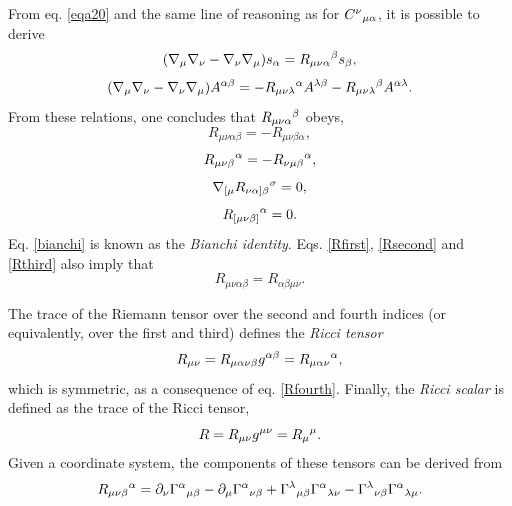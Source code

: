 \documentclass[
12pt,		%
openright,	%
twoside,  %
a4paper,			%
chapter=TITLE,		%
english,			%
french,				%
spanish,			%
brazil				%
]{USPSC-classe/USPSC}
\begin{document}
\begin{apendicesenv}
From eq. \ref{eqa20} and the same line of reasoning as for $C^{\nu}\mathstrut_{\mu\alpha}$, it is possible to derive 
\begin{equation}\label{Riedual}
    (\nabla_{\mu}\nabla_{\nu}-\nabla_{\nu}\nabla_{\mu})s_{\alpha}=R_{\mu\nu\alpha}\mathstrut^{\beta}s_{\beta},
\end{equation}
\begin{equation}\label{Rie2}
    (\nabla_{\mu}\nabla_{\nu}-\nabla_{\nu}\nabla_{\mu})A^{\alpha\beta}=-R_{\mu\nu\lambda}\mathstrut^{\alpha}A^{\lambda\beta}-R_{\mu\nu\lambda}\mathstrut^{\beta}A^{\alpha\lambda}.
\end{equation}
From these relations, one concludes that $R_{\mu\nu\alpha}\mathstrut^{\beta}$ obeys,
\begin{equation}\label{Rthird}
    R_{\mu\nu\alpha\beta}=-R_{\mu\nu\beta\alpha},
\end{equation}
\begin{equation}\label{Rfirst}
    R_{\mu\nu\beta}\mathstrut^{\alpha}=-R_{\nu\mu\beta}\mathstrut^{\alpha},
\end{equation}
\begin{equation}\label{bianchi}
    \nabla_{[\mu}R_{\nu\alpha]\beta}\mathstrut^{\sigma}=0,
\end{equation}
\begin{equation}\label{Rsecond}
    R_{[\mu\nu\beta]}\mathstrut^{\alpha}=0.
\end{equation}
Eq. \ref{bianchi} is known as the \textit{Bianchi identity}. Eqs. \ref{Rfirst}, \ref{Rsecond} and \ref{Rthird} also imply that
\begin{equation}\label{Rfourth}
    R_{\mu\nu\alpha\beta}=R_{\alpha\beta\mu\nu}.
\end{equation}

The trace of the Riemann tensor over the second and fourth indices (or equivalently, over the first and third) defines the \textit{Ricci tensor}
\begin{equation}
    R_{\mu\nu}=R_{\mu\alpha\nu\beta}g^{\alpha\beta}=R_{\mu\alpha\nu}\mathstrut^{\alpha},
\end{equation}
which is symmetric, as a consequence of eq. \ref{Rfourth}. Finally, the \textit{Ricci scalar} is defined as the trace of the Ricci tensor,
\begin{equation}
    R=R_{\mu\nu}g^{\mu\nu}=R_{\mu}\mathstrut^{\mu}.
\end{equation}
Given a coordinate system, the components of these tensors can be derived from \cite{Wald1984} 
\begin{equation}
    R_{\mu\nu\beta}\mathstrut^{\alpha}=\partial_{\nu}\Gamma^{\alpha}\mathstrut_{\mu\beta}-\partial_{\mu}\Gamma^{\alpha}\mathstrut_{\nu\beta}+\Gamma^{\lambda}\mathstrut_{\mu\beta}\Gamma^{\alpha}\mathstrut_{\lambda\nu}-\Gamma^{\lambda}\mathstrut_{\nu\beta}\Gamma^{\alpha}\mathstrut_{\lambda\mu}.
\end{equation}


\end{apendicesenv}
\end{document}
